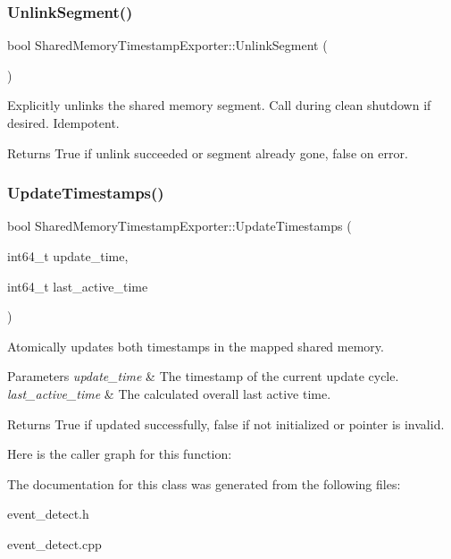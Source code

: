 \subsubsection{\texorpdfstring{Unlink\+Segment()}{UnlinkSegment()}}
{\footnotesize\ttfamily bool Shared\+Memory\+Timestamp\+Exporter\+::\+Unlink\+Segment (\begin{DoxyParamCaption}{ }\end{DoxyParamCaption})}



Explicitly unlinks the shared memory segment. Call during clean shutdown if desired. Idempotent. 

\begin{DoxyReturn}{Returns}
True if unlink succeeded or segment already gone, false on error. 
\end{DoxyReturn}
\mbox{\label{classEventDetect_1_1SharedMemoryTimestampExporter_af3f039d814ed24dde56b1d525d340a34}} 
\subsubsection{\texorpdfstring{Update\+Timestamps()}{UpdateTimestamps()}}
{\footnotesize\ttfamily bool Shared\+Memory\+Timestamp\+Exporter\+::\+Update\+Timestamps (\begin{DoxyParamCaption}\item[{int64\+\_\+t}]{update\+\_\+time,  }\item[{int64\+\_\+t}]{last\+\_\+active\+\_\+time }\end{DoxyParamCaption})}



Atomically updates both timestamps in the mapped shared memory. 


\begin{DoxyParams}{Parameters}
{\em update\+\_\+time} & The timestamp of the current update cycle. \\
\hline
{\em last\+\_\+active\+\_\+time} & The calculated overall last active time. \\
\hline
\end{DoxyParams}
\begin{DoxyReturn}{Returns}
True if updated successfully, false if not initialized or pointer is invalid. 
\end{DoxyReturn}
Here is the caller graph for this function\+:


The documentation for this class was generated from the following files\+:\begin{DoxyCompactItemize}
\item 
event\+\_\+detect.\+h\item 
event\+\_\+detect.\+cpp\end{DoxyCompactItemize}
